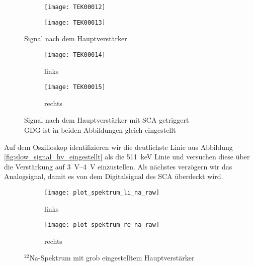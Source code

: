 \documentclass[11pt, ngerman, fleqn, DIV=15, headinclude, BCOR=2cm]{scrreprt}
\begin{document}
\begin{figure}[htbp]
	\centering
	\begin{subfigure}{0.49 \textwidth}
		\texttt{[image: TEK00012]}
	\end{subfigure}
	\begin{subfigure}{0.49 \textwidth}
		\texttt{[image: TEK00013]}
	\end{subfigure}
	\caption{%
		Signal nach dem Hauptverstärker
	}
	\label{fig:slow_signal_hv}
\end{figure}

\begin{figure}[htbp]
	\centering
	\begin{subfigure}{0.49 \textwidth}
		\texttt{[image: TEK00014]}
		\caption{%
			links
		}
		\label{fig:slow_signal_sca_trig-li}
	\end{subfigure}
	\begin{subfigure}{0.49 \textwidth}
		\texttt{[image: TEK00015]}
		\caption{%
			rechts
		}
		\label{fig:slow_signal_sca_trig-re}
	\end{subfigure}
	\caption{%
		Signal nach dem Hauptverstärker mit SCA getriggert\\
		GDG ist in beiden Abbildungen gleich eingestellt
	}
	\label{fig:slow_signal_sca_trig}
\end{figure}

Auf dem Oszilloskop identifizieren wir die deutlichste Linie aus Abbildung
\ref{fig:slow_signal_hv_eingestellt} als die \SI{511}{\kilo\electronvolt}
Linie und versuchen diese über die Verstärkung auf \SIrange{3}{4}{\volt}
einzustellen. Als nächstes verzögern wir das Analogsignal, damit es von dem
Digitalsignal des SCA überdeckt wird.

\begin{figure}[htbp]
	\centering
	\begin{subfigure}{0.49 \textwidth}
		\texttt{[image: plot\_spektrum\_li\_na\_raw]}
		\caption{%
			links
		}
		\label{fig:slow_signal_sca_trig-li_plot}
	\end{subfigure}
	\begin{subfigure}{0.49 \textwidth}
		\texttt{[image: plot\_spektrum\_re\_na\_raw]}
		\caption{%
			rechts
		}
		\label{fig:slow_signal_sca_trig-re_plot}
	\end{subfigure}
	\caption{%
		$^{22}\text{Na}$-Spektrum mit grob eingestelltem
		Hauptverstärker
	}
	\label{fig:slow_signal_sca_trig_plot}
\end{figure}
\end{document}
